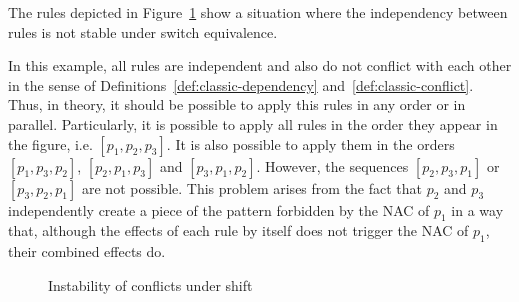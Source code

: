 \begin{example}\label{ex:process:instability}The rules depicted in Figure~\ref{fig:process:instability} show a situation where the independency between rules is not stable under switch equivalence.

  In this example, all rules are independent and also do not conflict with each other in the sense of Definitions~\ref{def:classic-dependency} and~\ref{def:classic-conflict}. Thus, in theory, it should be possible to apply this rules in any order or in parallel. Particularly, it is possible to apply all rules in the order they appear in the figure, i.e. $[p_1, p_2, p_3]$. It is also possible to apply them in the orders $[p_1, p_3, p_2]$, $[p_2, p_1, p_3]$ and $[p_3, p_1, p_2]$. However, the
  sequences $[p_2, p_3, p_1]$ or $[p_3, p_2, p_1]$ are not possible. This problem arises from the fact that $p_2$ and $p_3$ independently create a piece of the pattern forbidden by the NAC of $p_1$ in a way that, although the effects of each rule by itself does not trigger the NAC of $p_1$, their combined effects do.

\begin{figure}[!ht]
  \centering
  \caption{Instability of conflicts under shift\\}\label{fig:process:instability}
\end{figure}

\end{example}

